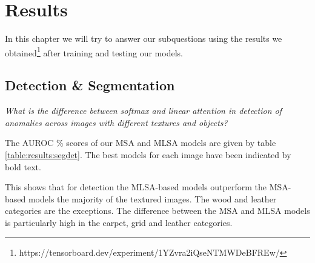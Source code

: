 \chapter{Results}\label{ch:results}

In this chapter we will try to answer our subquestions using the results we obtained\footnote{https://tensorboard.dev/experiment/1YZvra2iQseNTMWDeBFREw/} after training and testing our models.

\section{Detection \& Segmentation}
\label{sec:results:det-seg}

\textsl{What is the difference between softmax and linear attention in detection of anomalies across images with different textures and objects?}

The AUROC \% scores of our MSA and MLSA models are given by table \ref{table:results:segdet}. The best models for each image have been indicated by bold text.

This shows that for detection the MLSA-based models outperform the MSA-based models the majority of the textured images. The wood and leather categories are the exceptions. The difference between the MSA and MLSA models is particularly high in the carpet, grid and leather categories.

